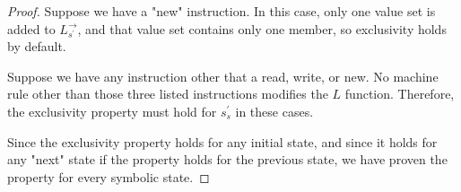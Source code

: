 \begin{proof}
Suppose we have a "new" instruction. In this case, only one value set is added to $L_{s^\prime}^\rightarrow$, and that value set contains only one member, so exclusivity holds by default.

Suppose we have any instruction other that a read, write, or new. No machine rule other than those three listed instructions modifies the $L$ function. Therefore, the exclusivity property must hold for $s_s^\prime$ in these cases.

Since the exclusivity property holds for any initial state, and since it holds for any "next" state if the property holds for the previous state, we have proven the property for every symbolic state.
\end{proof}

%
%
